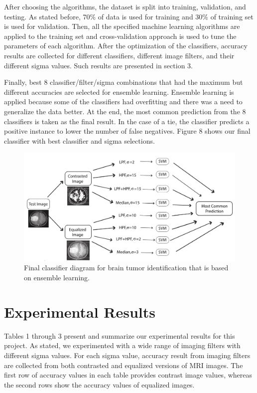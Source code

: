 \documentclass[conference]{IEEEtran}
\begin{document}
After choosing the algorithms, the dataset is split into training, validation, and testing. As stated before, 70\% of data is used for training and 30\% of training set is used for validation. Then, all the specified machine learning algorithms are applied to the training set and cross-validation approach is used to tune the parameters of each algorithm. After the optimization of the classifiers, accuracy results are collected for different classifiers, different image filters, and their different sigma values. Such results are presented in section 3. 

Finally, best 8 classifier/filter/sigma combinations that had the maximum but different accuracies are selected for ensemble learning. Ensemble learning is applied because some of the classifiers had overfitting and there was a need to generalize the data better. At the end, the most common prediction from the 8 classifiers is taken as the final result. In the case of a tie, the classifier predicts a positive instance to lower the number of false negatives. Figure 8 shows our final classifier with best classifier and sigma selections.

\begin{figure}[h]
\centering
\includegraphics[scale=0.1]{final_classifier_diagram}
\caption{Final classifier diagram for brain tumor identification that is based on ensemble learning.}
\end{figure}

\section{Experimental Results}\label{results}
Tables 1 through 3 present and summarize our experimental results for this project. As stated, we experimented with a wide range of imaging filters with different sigma values. For each sigma value, accuracy result from imaging filters are collected from both contrasted and equalized versions of MRI images. The first row of accuracy values in each table provides contrast image values, whereas the second rows show the accuracy values of equalized images. 
\end{document}
